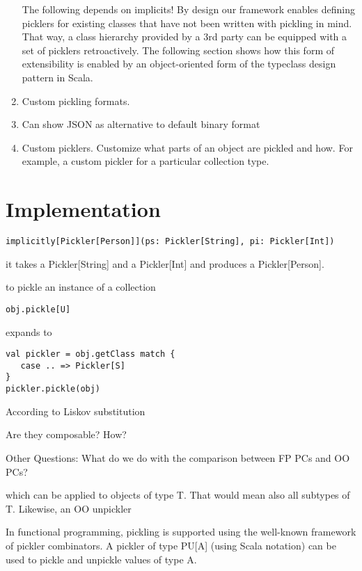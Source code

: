 \documentclass[preprint,10pt]{sigplanconf}
\theoremstyle{definition}
\begin{document}
\begin{enumerate}
\item [The following depends on implicits!] By design our framework enables defining picklers for existing classes that have not been written with pickling in mind. That way, a class hierarchy provided by a 3rd party can be equipped with a set of picklers retroactively. The following section shows how this form of extensibility is enabled by an object-oriented form of the typeclass design pattern in Scala.
\item Custom pickling formats.
\item Can show JSON as alternative to default binary format
\item Custom picklers. Customize what parts of an object are pickled and how. For example, a custom pickler for a particular collection type.
\end{enumerate}

\section{Implementation}

\begin{verbatim}
implicitly[Pickler[Person]](ps: Pickler[String], pi: Pickler[Int])
\end{verbatim}

it takes a Pickler[String] and a Pickler[Int] and produces a Pickler[Person].

to pickle an instance of a collection

\begin{verbatim}
obj.pickle[U]
\end{verbatim}

expands to

\begin{verbatim}
val pickler = obj.getClass match {
   case .. => Pickler[S]
}
pickler.pickle(obj)
\end{verbatim}

According to Liskov substitution

Are they composable? How?

Other Questions:
What do we do with the comparison between FP PCs and OO PCs?


which can be applied to objects of type T. That would mean also all subtypes of T. Likewise, an OO unpickler


In functional programming, pickling is supported using the well-known framework of pickler combinators. A pickler of type PU[A] (using Scala notation) can be used to pickle and unpickle values of type A.
\end{document}
